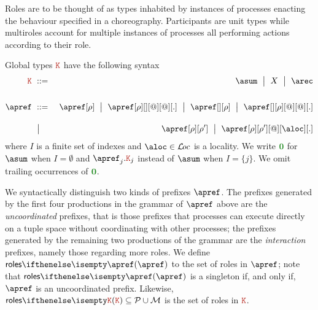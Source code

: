 Roles are to be thought of as types inhabited by instances of
processes enacting the behaviour specified in a choreography.
%
Participants are unit types while multiroles account for multiple
instances of processes all performing actions according to their role.

Global types $\aK$ have the following syntax
\begin{eqnarray*}
  \aK & \bnfdef & \asum \bnfmid
                  X \bnfmid
                  \arec
  \\[1.5em]
  \apref & \bnfdef & \apref[\arole] \bnfmid
                     \apref[\arole][{}][@][@][.] \bnfmid
                     \apref[{}][\arole] \bnfmid
                     \apref[{}][\arole][@][@][.]
  \\[1em]
        & \bnfmid & \apref[\arole][\arole'] \bnfmid
                    \apref[\arole][\arole'][@][\aloc][.]
\end{eqnarray*}
where $I$ is a finite set of indexes and $\aloc \in \locset$ is a
locality.
%
We write $\nil$ for $\asum$ when $I = \emptyset$ and
$\apref_j.\aK_j$ instead of $\asum$ when $I = \{j\}$.
%
We omit trailing occurrences of $\nil$.

We syntactically distinguish two kinds of prefixes $\apref$.
%
The prefixes generated by the first four productions in the grammar of
$\apref$ above are the \emph{uncoordinated} prefixes, that is those
prefixes that processes can execute directly on a tuple space without
coordinating with other processes; the prefixes generated by the
remaining two productions of the grammar are the \emph{interaction}
prefixes, namely those regarding more roles.  
%
We define $\roles \apref$ to the set of roles in $\apref$; note that
$\roles \apref$ is a singleton if, and only if, $\apref$ is an
uncoordinated prefix.
%
Likewise, $\roles \aK \subseteq \participants \cup \multiroles$ is the
set of roles in $\aK$.


